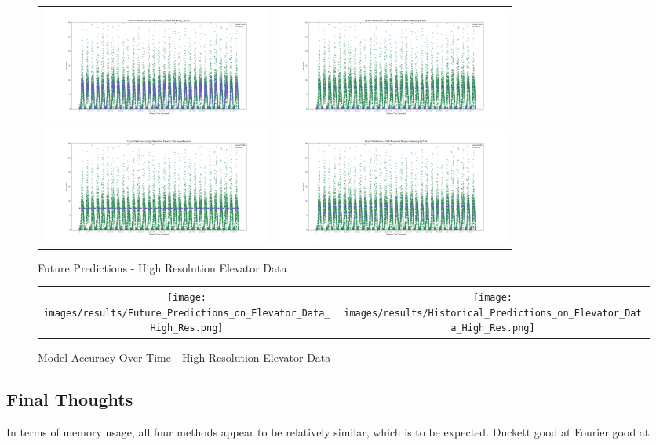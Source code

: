 \begin{figure}
  \begin{tabular}{cc}
    {\includegraphics[width = 3in]{images/results/Future_high_res_elevator_Duckett.png}} &
    {\includegraphics[width = 3in]{images/results/Future_high_res_elevator_FreMEn.png}} \\
    {\includegraphics[width = 3in]{images/results/Future_high_res_elevator_Gaussian.png}} &
    {\includegraphics[width = 3in]{images/results/Future_high_res_elevator_HyT-EM.png}} \\
  \end{tabular}
  \caption{Future Predictions - High Resolution Elevator Data}
  \label{figure:Future_Predictions_-_High_Resolution_Elevator_Data}
\end{figure}

\begin{figure}
  \begin{tabular}{cc}
    {\texttt{[image: images/results/Future\_Predictions\_on\_Elevator\_Data\_High\_Res.png]}} &
    {\texttt{[image: images/results/Historical\_Predictions\_on\_Elevator\_Data\_High\_Res.png]}} \\
  \end{tabular}
  \caption{Model Accuracy Over Time - High Resolution Elevator Data}
  \label{figure:Model_Accuracy_Over_Time_-_High_Resolution_Elevator_Data}
\end{figure}


\subsection{ Final Thoughts }
In terms of memory usage, all four methods appear to be relatively similar, which is to be expected.
Duckett good at
Fourier good at



